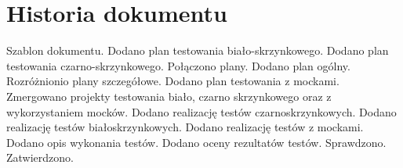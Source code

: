 \documentclass[10pt]{dokument-tiwo}
\begin{document}
\section*{Historia dokumentu}
\begin{versions}
        Szablon dokumentu.
        Dodano plan testowania biało-skrzynkowego.
        Dodano plan testowania czarno-skrzynkowego.
        Połączono plany. Dodano plan ogólny. Rozróżnionio plany
        szczegółowe.
        Dodano plan testowania z mockami.
        Zmergowano projekty testowania biało\dywiz, czarno\dywiz
        skrzynkowego oraz z wykorzystaniem mocków.
        Dodano realizację testów czarno\dywiz skrzynkowych.
        Dodano realizację testów biało\dywiz skrzynkowych.
        Dodano realizację testów z mockami.
        Dodano opis wykonania testów.
        Dodano oceny rezultatów testów.
        Sprawdzono. Zatwierdzono.
\end{versions}
\end{document}
